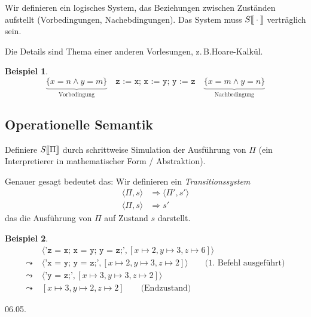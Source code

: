 \documentclass[a4paper,12pt]{article}
\theoremstyle{definition}
\newtheorem*{example}{Beispiel}
\theoremstyle{plain}
\theoremstyle{remark}
\newcommand{\lsem}{\mathrm{[}\kern-.14em\mathrm{[}}
\newcommand{\rsem}{\mathrm{]}\kern-.14em\mathrm{]}}
\newcommand{\zb}{z.\,B.\;}
\newcommand{\sem}[1]{S\lsem#1\rsem}
\begin{document}
Wir definieren ein logisches System, das Beziehungen zwischen Zuständen aufstellt (Vorbedingungen, Nachebdingungen). Das System muss $\sem{\cdot}$ verträglich sein.

Die Details sind Thema einer anderen Vorlesungen, \zb Hoare-Kalkül.

\begin{example}
    $$\underbrace{\{ x = n \wedge y = m \}}_{\text{Vorbedingung}} \quad \texttt{z := x; x := y; y := z} \quad \underbrace{\{ x = m \wedge y = n \}}_{\text{Nachbedingung}}$$
\end{example}



\subsection{Operationelle Semantik}

Definiere $\sem{\Pi}$ durch schrittweise Simulation der Ausführung von $\Pi$ (ein Interpretierer in mathematischer Form / Abstraktion).

Genauer gesagt bedeutet das: Wir definieren ein \emph{Transitionssystem}
\begin{align*}
    \langle \Pi, s \rangle & \Rightarrow \langle \Pi', s' \rangle \\
    \langle \Pi, s \rangle & \Rightarrow s'
\end{align*}
das die Ausführung von $\Pi$ auf Zustand $s$ darstellt.

\begin{example}
    \begin{align*}
        & \langle \texttt{'z = x; x = y; y = z;'}, [x \mapsto 2, y \mapsto 3, z \mapsto 6] \rangle \\
        \leadsto \; & \langle \texttt{'x = y; y = z;'}, [x \mapsto 2, y \mapsto 3, z \mapsto 2] \rangle \quad\quad \text{(1. Befehl ausgeführt)} \\
        \leadsto \; & \langle \texttt{'y = z;'}, [x \mapsto 3, y \mapsto 3, z \mapsto 2] \rangle \\
        \leadsto \; & [x \mapsto 3, y \mapsto 2, z \mapsto 2] \quad\quad \text{(Endzustand)}
    \end{align*}
\end{example}



\newpage
\hfill 06.05.
\end{document}
